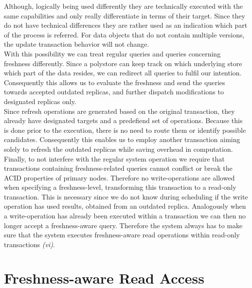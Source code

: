Although, logically being used differently they are technically executed with the same capabilities and only really differentiate in terms of their target.
Since they do not have technical differences they are rather used as an indication which part of the process is referred.
For data objects that do not contain multiple versions, the update transaction behavior will not change.\\
With this possibility we can treat regular queries and queries concerning freshness differently. Since a polystore can keep track on which 
underlying store which part of the data resides, we can redirect all queries to fulfil our intention. Consequently this allows us to evaluate the freshness
and send the queries towards accepted outdated replicas, and further dispatch modifications to designated replicas only.\\
Since refresh operations are generated based on the original transaction, they already have designated targets and a predefiend set of operations.
Because this is done prior to the execution, there is no need to route them or identify possible candidates.
Consequently this enables us to employ another transaction aiming solely to refresh the outdated replicas while saving overhead in computation.\\
Finally, to not interfere with the regular system operation we require that transactions containing freshness-related queries cannot conflict or break the ACID properties 
of primary nodes. 
Therefore no write-operations are allowed when specifying a freshness-level, transforming this transaction to a read-only transaction.
This is necessary since we do not know during scheduling if the write operation has used results, obtained from an outdated replica.
Analogously when a write-operation has already been executed within a transaction we can then no longer accept a freshness-aware query. 
Therefore the system always has to make sure that the system executes freshness-aware read operations within read-only transactions \textit{(vi)}. 






\section{Freshness-aware Read Access}
\label{sec:read_access}

